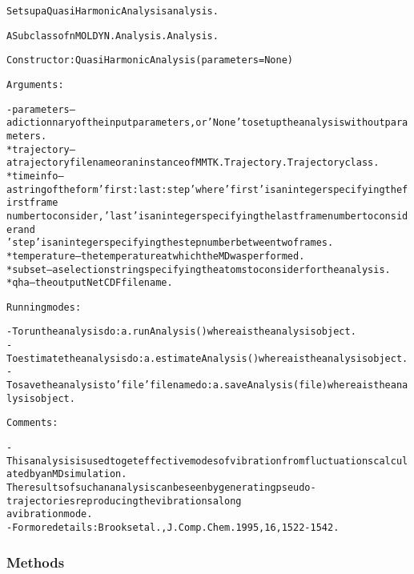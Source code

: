 \begin{alltt}
Sets up a Quasi Harmonic Analysis analysis.

A Subclass of nMOLDYN.Analysis.Analysis. 

Constructor: QuasiHarmonicAnalysis({\textbar}parameters{\textbar} = None)

Arguments:

    - {\textbar}parameters{\textbar} -- a dictionnary of the input parameters, or 'None' to set up the analysis without parameters.
        * trajectory  -- a trajectory file name or an instance of MMTK.Trajectory.Trajectory class.
        * timeinfo    -- a string of the form 'first:last:step' where 'first' is an integer specifying the first frame 
                         number to consider, 'last' is an integer specifying the last frame number to consider and 
                         'step' is an integer specifying the step number between two frames.
        * temperature -- the temperature at which the MD was performed.
        * subset      -- a selection string specifying the atoms to consider for the analysis.
        * qha         -- the output NetCDF file name.
    
Running modes:

    - To run the analysis do: a.runAnalysis() where a is the analysis object.
    - To estimate the analysis do: a.estimateAnalysis() where a is the analysis object.
    - To save the analysis to 'file' file name do: a.saveAnalysis(file) where a is the analysis object.
    
Comments:

    - This analysis is used to get effective modes of vibration from fluctuations calculated by an MD simulation. 
      The results of such an analysis can be seen by generating pseudo-trajectories reproducing the vibrations along
      a vibration mode.
    - For more details: Brooks et al., J. Comp. Chem. 1995, 16, 1522-1542.
\end{alltt}



  \subsubsection{Methods}

    \vspace{0.5ex}

